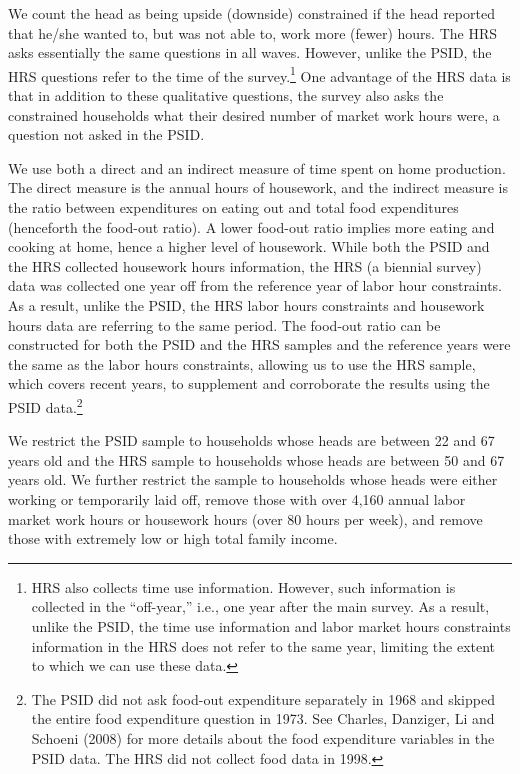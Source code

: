 \noindent We count the head as being upside (downside) constrained if the head reported that he/she wanted to, but was not able to, work more (fewer) hours.  The HRS asks essentially the same questions in all waves. However, unlike the PSID, the HRS questions refer to the time of the survey.\footnote{HRS also collects time use information. However, such information is collected in the ``off-year,'' i.e., one year after the main survey. As a result, unlike the PSID, the time use information and labor market hours constraints information in the HRS does not refer to the same year, limiting the extent to which we can use these data.} One advantage of the HRS data is that in addition to these qualitative questions, the survey also asks the constrained households what their desired number of market work hours were, a question not asked in the PSID.

We use both a direct and an indirect measure of time spent on home production. The direct measure is the annual hours of housework, and the indirect measure is the ratio between expenditures on eating out and total food expenditures (henceforth the food-out ratio). A lower food-out ratio implies more eating and cooking at home, hence a higher level of housework. While both the PSID and the HRS collected housework hours information, the HRS (a biennial survey) data was collected one year off from the reference year of labor hour constraints. As a result, unlike the PSID, the HRS labor hours constraints and housework hours data are referring to the same period.  The food-out ratio can be constructed for both the PSID and the HRS samples and the reference years were the same as the labor hours constraints, allowing us to use the HRS sample, which covers recent years, to supplement and corroborate the results using the PSID data.\footnote{The PSID did not ask food-out expenditure separately in 1968 and skipped the entire food expenditure question in 1973. See Charles, Danziger, Li and Schoeni (2008) for more details about the food expenditure variables in the PSID data. The HRS did not collect food data in 1998.}

We restrict the PSID sample to households whose heads are between 22 and 67 years old and the HRS sample to households whose heads are between 50 and 67 years old. We further restrict the sample to households whose heads were either working or temporarily laid off, remove those with over 4,160 annual labor market work hours or housework hours (over 80 hours per week), and remove those with extremely low or high total family income.

